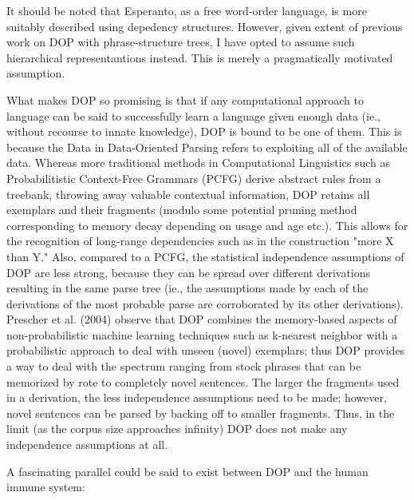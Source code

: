 \documentclass[10pt,a4paper]{article}
\begin{document}
It should be noted that Esperanto, as a free word-order language, is more
suitably described using depedency structures. However, given extent of
previous work on DOP with phrase-structure trees, I have opted to assume such
hierarchical representantions instead. This is merely a pragmatically motivated
assumption. 

What makes DOP so promising is that if any computational approach to language
can be said to successfully learn a language given enough data (ie., without
recourse to innate knowledge), DOP is bound to be one of them.  This is because
the Data in Data-Oriented Parsing refers to exploiting all of the available
data. Whereas more traditional methods in Computational Linguistics such as
Probabilitistic Context-Free Grammars (PCFG) derive abstract rules from a
treebank, throwing away valuable contextual information, DOP retains all
exemplars and their fragments (modulo some potential pruning method
corresponding to memory decay depending on usage and age etc.). This allows for
the recognition of long-range dependencies such as in the construction "more X
than Y." Also, compared to a PCFG, the statistical independence assumptions of
DOP are less strong, because they can be spread over different derivations
resulting in the same parse tree (ie., the assumptions made by each of the
derivations of the most probable parse are corroborated by its other
derivations). Prescher et al. (2004) observe that DOP combines the memory-based
aspects of non-probabilistic machine learning techniques such as k-nearest
neighbor with a probabilistic approach to deal with unseen (novel) exemplars;
thus DOP provides a way to deal with the spectrum ranging from stock phrases
that can be memorized by rote to completely novel sentences. The larger the
fragments used in a derivation, the less independence assumptions need to be
made; however, novel sentences can be parsed by backing off to smaller
fragments. Thus, in the limit (as the corpus size approaches infinity) DOP does
not make any independence assumptions at all. 

A fascinating parallel could be said to exist between DOP and the human immune
system:
\end{document}
